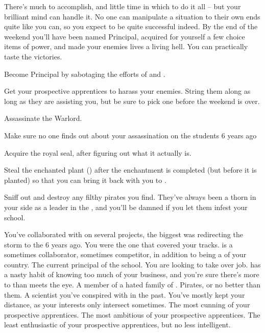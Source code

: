 \documentclass[char]{GL2020}
\begin{document}
There’s much to accomplish, and little time in which to do it all -- but your brilliant mind can handle it.  No one can manipulate a situation to their own ends quite like you can, so you expect to be quite successful indeed. By the end of the weekend you’ll have been named Principal, acquired for yourself a few choice items of power, and made your enemies lives a living hell.  You can practically taste the victories.

\begin{itemz}[Goals]
	\item Become Principal by sabotaging the efforts of \cMusic{} and \cBeetle{}.
	\item Get your prospective apprentices to harass your enemies. String them along as long as they are assisting you, but be sure to pick one before the weekend is over.
\item Assassinate the \pShippies{} Warlord.
\item Make sure no one finds out about your assassination on the students 6 years ago
\item Acquire the \pFarm{} royal seal, after figuring out what it actually is.
\item Steal the enchanted plant (\iBeansMB{\MYnumber}) after the enchantment is completed (but before it is planted) so that you can bring it back with you to \pFarm{}.
\item Sniff out and destroy any filthy pirates you find. They’ve always been a thorn in your side as a leader in the \pFarm{}, and you’ll be damned if you let them infest your school.
\end{itemz}

\begin{itemz}[Notes]
	\item 
\end{itemz}

\begin{contacts}
	\contact{\cDiplomat{}} You’ve collaborated with \cDiplomat{} on several projects, the biggest was redirecting the storm to the \pShip{} 6 years ago. You were the one that covered your tracks.
	\contact{\cPrince{}} is a sometimes collaborator, sometimes competitor, in addition to being a \cPrince{\Heir} of your country.
\contact{\cPrincipal{}} The current principal of the school. You are looking to take over \cPrincipal{\their} job.
\contact{\cInterpol{}} has a nasty habit of knowing too much of your business, and you’re sure there’s more to \cInterpol{\them} than meets the eye.
\contact{\cJuniorStatesman{}} A member of a hated family of \pShippies{}. Pirates, or no better than them.
\contact{\cHeadScientist{}} A scientist you’ve conspired with in the past. You’ve mostly kept your distance, as your interests only intersect sometimes.
\contact{\cLibAssist{}} The most cunning of your prospective apprentices.
\contact{\cAmbition{}} The most ambitious of your prospective apprentices.
\contact{\cPirateChild{}} The least enthusiastic of your prospective apprentices, but no less intelligent.
\end{contacts}
\end{document}
